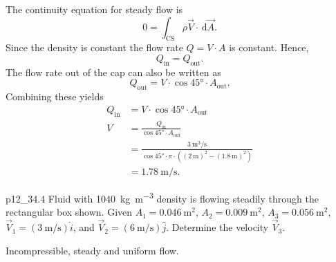 \begin{derivation}
  The continuity equation for steady flow is
  \[ 
    0 = \int_{\mathrm{CS}} \rho \Vec{V} \cdot \, \mathrm{d} \Vec{A}
  .\]
  Since the density is constant the flow rate $Q = V \cdot A$ is constant.
  Hence,
  \[
    Q_{\mathrm{in}} = Q_{\mathrm{out}}
  .\]
  The flow rate out of the cap can also be written as
  \[ 
  Q_{\mathrm{out}} = V \cdot \cos \ang{45} \cdot A_{\mathrm{out}}
.\]
  Combining these yields
  \begin{align*}
    Q_{\mathrm{in}} &= V \cdot \cos \ang{45} \cdot A_{\mathrm{out}} \\
    V &= \frac{Q_{\mathrm{in}}}{\cos \ang{45} \cdot A_{\mathrm{out}}} \\
      &= \frac{\qty{3}{\cubic\m\per\s}}{\cos \ang{45} \cdot \pi \cdot \left( \left( \qty{2}{\m}  \right)^2 - \left( \qty{1,8}{\m}  \right)^2 \right)} \\
      &= \qty{1,78}{\m\per\s} 
  .\end{align*}
\end{derivation}


\begin{problemwithimage}{p12_3}{4.4}
  Fluid with \qty{1040}{\kg\per\cubic\m} density is flowing steadily through the rectangular box shown.
  Given $A_1 = \qty{0,046}{\m\squared}$, $A_2 = \qty{0,009}{\square\m}$, $A_3 = \qty{0,056}{\square\m}$, $\Vec{V}_1 = \left( \qty{3}{\m\per\s}  \right)\hat{i} $, and $\Vec{V}_2 = \left( \qty{6}{\m\per\s}  \right) \hat{j}$. Determine the velocity $\Vec{V}_3$.
\end{problemwithimage}

\begin{assumptions}
  \item Incompressible, steady and uniform flow.
\end{assumptions}

